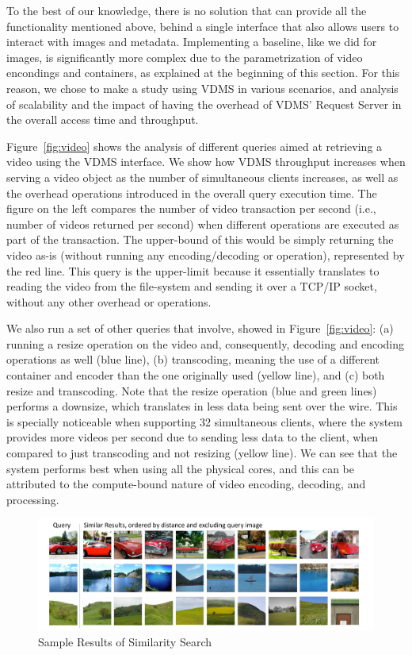 To the best of our knowledge, there is no solution that can provide
all the functionality mentioned above, behind a single interface
that also allows users to interact with images and metadata.
Implementing a baseline, like we did for images, is significantly more complex
due to the parametrization of video encondings and containers, 
as explained at the beginning of this section.
For this reason, we chose to make a study using VDMS in various scenarios,
and analysis of scalability and the impact of having the overhead of VDMS' Request
Server in the overall access time and throughput.

Figure~\ref{fig:video} shows the analysis of different queries aimed
at retrieving a video using the VDMS interface.
We show how VDMS throughput increases when serving
a video object as the number of simultaneous clients increases, as well as the
overhead operations introduced in the overall query execution time.
The figure on the left compares the number of video transaction per second
(i.e., number of videos returned per second) when different operations
are executed as part of the transaction. The upper-bound of this would be
simply returning the video as-is (without running any encoding/decoding or
operation), represented by the red line. This query is the upper-limit because
it essentially translates to reading the video from the file-system and sending
it over a TCP/IP socket, without any other overhead or operations.

We also run a set of other queries that involve, showed in Figure~\ref{fig:video}:
(a) running a resize operation on the video and, consequently,
decoding and encoding operations as well (blue line),
(b) transcoding, meaning the use of a different container and encoder
than the one originally used (yellow line), and
(c) both resize and transcoding.
Note that the resize operation (blue and green lines) performs a downsize,
which translates in less data being sent over the wire.
This is specially noticeable when supporting 32 simultaneous clients, 
where the system provides more videos per second due to sending less data to 
the client, when compared to just transcoding and not resizing (yellow line).
We can see that the system performs best when using all the physical cores,
and this can be attributed to the compute-bound nature of video
encoding, decoding, and processing.

\begin{figure}[ht!]
\centering
\includegraphics[width=\textwidth]{figures/feature_img_results}
\caption{Sample Results of Similarity Search}
\label{fig:similarity}
\end{figure}

